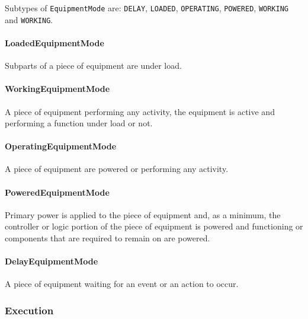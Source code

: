 \FloatBarrier

Subtypes of \texttt{EquipmentMode} are: \texttt{DELAY}, \texttt{LOADED}, \texttt{OPERATING}, \texttt{POWERED}, \texttt{WORKING} and \texttt{WORKING}. 
\FloatBarrier

\paragraph{LoadedEquipmentMode}\mbox{}
\label{sec:LoadedEquipmentMode}



Subparts of a piece of equipment are under load.


\paragraph{WorkingEquipmentMode}\mbox{}
\label{sec:WorkingEquipmentMode}



A piece of equipment performing any activity, the equipment is active and performing a function under load or not.


\paragraph{OperatingEquipmentMode}\mbox{}
\label{sec:OperatingEquipmentMode}



A piece of equipment are powered or performing any activity.


\paragraph{PoweredEquipmentMode}\mbox{}
\label{sec:PoweredEquipmentMode}



Primary  power is  applied  to the  piece  of  equipment and,  as  a minimum, the controller or logic portion of the piece of equipment is powered and functioning or components that are required to remain on are powered.


\paragraph{DelayEquipmentMode}\mbox{}
\label{sec:DelayEquipmentMode}



A piece of equipment waiting for an event or an action to occur.


\subsubsection{Execution}
\label{sec:Execution}



